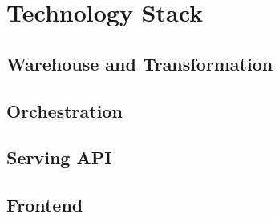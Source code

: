 \section{Technology Stack}
\label{sec:foundations:tools}

\subsection{Warehouse and Transformation}
\label{sec:foundations:tools:warehouse}

\subsection{Orchestration}
\label{sec:foundations:tools:orchestration}

\subsection{Serving API}
\label{sec:foundations:tools:api}

\subsection{Frontend}
\label{sec:foundations:tools:frontend}
